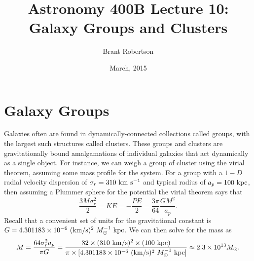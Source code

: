 \documentclass[]{article}
\title{Astronomy 400B Lecture 10: Galaxy Groups and Clusters}
\author{Brant Robertson}
\date{March, 2015}
\begin{document}
\maketitle

\section{Galaxy Groups}

Galaxies often are found in dynamically-connected
collections called groups, with the largest such
structures called clusters. These groups and
clusters are gravitationally bound amalgamations
of individual galaxies that act dynamically as
a single object.  For instance, we can weigh
a group of cluster using the virial theorem,
assuming some mass profile for the system.  For
a group with a $1-D$ radial
velocity dispersion of $\sigma_r =310~\mathrm{km}~\mathrm{s}^{-1}$
and typical radius of $a_p=100~\mathrm{kpc}$, then assuming
a Plummer sphere for the potential the 
virial theorem says that
\begin{equation}
\frac{3M\sigma_r^2}{2} = KE = -\frac{PE}{2} = \frac{3\pi}{64}\frac{GM^2}{a_p}.
\end{equation}
\noindent
Recall that a convenient set of units for the gravitational
constant is $G=4.301183\times10^{-6}~(\mathrm{km}/\mathrm{s})^2~M_{\odot}^{-1}~\mathrm{kpc}$.
We can then solve for the mass as
\begin{equation}
M = \frac{64\sigma_r^2 a_p}{\pi G} = \frac{32\times(310~\mathrm{km}/\mathrm{s})^2\times(100~\mathrm{kpc})}{\pi \times [4.301183\times10^{-6}~(\mathrm{km}/\mathrm{s})^2~M_{\odot}^{-1}~\mathrm{kpc}]} \approx 2.3\times10^{13}M_{\odot}.
\end{equation}
\end{document}
